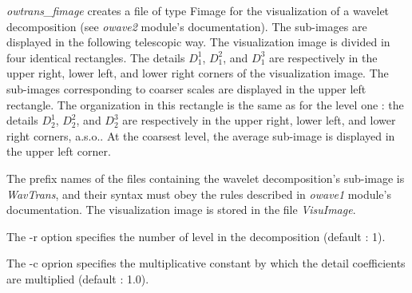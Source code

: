 {\em owtrans\_fimage} creates a file of type Fimage for the visualization of a wavelet decomposition (see {\em owave2} module's documentation). 
The sub-images are displayed in the following telescopic way. 
The visualization image is divided in four identical rectangles. 
The details $D_{1}^{1}$, $D_{1}^{2}$, and $D_{1}^{3}$ are respectively in the upper right, lower left, and lower right corners of the visualization image. 
The sub-images corresponding to coarser scales are displayed in the upper left rectangle. The organization in this rectangle is the same as for the level one : the details $D_{2}^{1}$, $D_{2}^{2}$, and $D_{2}^{3}$ are respectively in the upper right, lower left, and lower right corners, a.s.o.. 
At the coarsest level, the average sub-image is displayed in the upper left corner. 

The prefix names of the files containing the wavelet decomposition's sub-image is {\em WavTrans}, and their syntax must obey the rules described in {\em owave1} module's documentation. 
The visualization image is stored in the file {\em VisuImage}.

The -r option specifies the number of level in the decomposition (default : 1).

The -c oprion specifies the multiplicative constant by which the detail coefficients are multiplied (default : 1.0).

